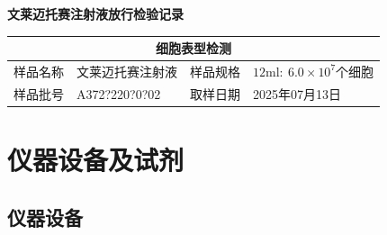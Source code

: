 \documentclass[UTF8,10pt,a4paper,fontset=fandol]{ctexart}
\newcommand{\fieldvalue}[1]{#1}
\newcommand{\handwritten}[1]{#1}
\begin{document}
\newpage

\begin{center}
\textbf{文莱迈托赛注射液放行检验记录}
\end{center}

\begin{center}
\begin{tabularx}{\textwidth}{|p{}|X|p{}|X|}
\hline
\multicolumn{4}{|c|}{细胞表型检测} \\ \hline
样品名称 & 文莱迈托赛注射液 & 样品规格 & $12\mathrm{ml}:~6.0\times10^7$个细胞 \\ \hline
样品批号 &
\fieldvalue{\handwritten{A372?220?0?02}} &
取样日期 &
\fieldvalue{\handwritten{2025年07月13日}} \\ \hline
\end{tabularx}
\end{center}

\section{仪器设备及试剂}

\subsection{仪器设备}
\end{document}
